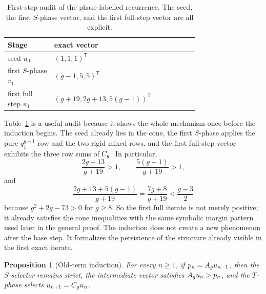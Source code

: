 \documentclass[11pt]{article}
\newtheorem{proposition}[theorem]{Proposition}
\theoremstyle{remark}
\numberwithin{equation}{section}
\begin{document}
\begin{table}[t]
\centering
\small
\begin{tabular}{p{0.18\linewidth}p{0.56\linewidth}}
\toprule
Stage & exact vector \\
\midrule
seed \(u_0\) & \((1,1,1)^{\mathsf T}\) \\
first \(S\)-phase \(v_1\) & \((g-1,5,5)^{\mathsf T}\) \\
first full step \(u_1\) & \((g+19,2g+13,5(g-1))^{\mathsf T}\) \\
\bottomrule
\end{tabular}
\caption{First-step audit of the phase-labelled recurrence.  The seed, the first \(S\)-phase vector, and the first full-step vector are all explicit.}
\label{tab:firststep}
\end{table}

Table~\ref{tab:firststep} is a useful audit because it shows the whole
mechanism once before the induction begins.  The seed already lies in the cone,
the first \(S\)-phase applies the pure \(q_1^{g-1}\) row and the two rigid
mixed rows, and the first full-step vector exhibits the three row sums of
\(C_g\).  In particular,
\[
\frac{2g+13}{g+19}>1,\qquad
\frac{5(g-1)}{g+19}>1,
\]
and
\[
\frac{2g+13+5(g-1)}{g+19}=\frac{7g+8}{g+19}<\frac{g-3}{2}
\]
because \(g^2+2g-73>0\) for \(g\geq 8\).  So the first full iterate is not
merely positive; it already satisfies the cone inequalities with the same
symbolic margin pattern used later in the general proof.  The induction does
not create a new phenomenon after the base step.  It formalizes the persistence
of the structure already visible in the first exact iterate.

\begin{proposition}[Old-term induction]\label{prop:induction}
For every \(n\geq 1\), if \(p_n=A_g u_{n-1}\), then the \(S\)-selector remains
strict, the intermediate vector satisfies \(A_g u_n>p_n\), and the \(T\)-phase
selects \(u_{n+1}=C_g u_n\).
\end{proposition}
\end{document}
